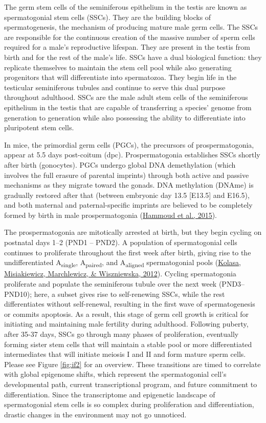 \documentclass[12pt,twoside]{reedthesis}
\begin{document}
The germ stem cells of the seminiferous epithelium in the testis are
known as spermatogonial stem cells (SSCs). They are the building blocks
of spermatogenesis, the mechanism of producing mature male germ cells.
The SSCs are responsible for the continuous creation of the massive
number of sperm cells required for a male's reproductive lifespan. They
are present in the testis from birth and for the rest of the male's
life. SSCs have a dual biological function: they replicate themselves to
maintain the stem cell pool while also generating progenitors that will
differentiate into spermatozoa. They begin life in the testicular
seminiferous tubules and continue to serve this dual purpose throughout
adulthood. SSCs are the male adult stem cells of the seminiferous
epithelium in the testis that are capable of transferring a species'
genome from generation to generation while also possessing the ability
to differentiate into pluripotent stem cells.

In mice, the primordial germ cells (PGCs), the precursors of
prospermatogonia, appear at 5.5 days post-coitum (dpc). Prospermatogonia
establishes SSCs shortly after birth (gonocytes). PGCs undergo global
DNA demethylation (which involves the full erasure of parental imprints)
through both active and passive mechanisms as they migrate toward the
gonads. DNA methylation (DNAme) is gradually restored after that
(between embryonic day 13.5 {[}E13.5{]} and E16.5), and both maternal and
paternal-specific imprints are believed to be completely formed by birth
in male prospermatogonia (\protect\hyperlink{ref-hammoud2015}{Hammoud et al., 2015}).

The prospermatogonia are mitotically arrested at birth, but they begin
cycling on postnatal days 1--2 (PND1 -- PND2). A population of
spermatogonial cells continues to proliferate throughout the first week
after birth, giving rise to the undifferentiated A\textsubscript{single}, A\textsubscript{paired}, and A\textsubscript{aligned} spermatogonial pools (\protect\hyperlink{ref-kolasa2012}{Kolasa, Misiakiewicz, Marchlewicz, \& Wiszniewska, 2012}). Cycling
spermatogonia proliferate and populate the seminiferous tubule over the
next week (PND3--PND10); here, a subset gives rise to self-renewing
SSCs, while the rest differentiates without self-renewal, resulting in
the first wave of spermatogenesis or commits apoptosis. As a result,
this stage of germ cell growth is critical for initiating and
maintaining male fertility during adulthood. Following puberty, after
35-37 days, SSCs go through many phases of proliferation, eventually
forming sister stem cells that will maintain a stable pool or more
differentiated intermediates that will initiate meiosis I and II and
form mature sperm cells. Please see Figure \ref{fig:if2} for an overview. These transitions are timed to correlate with
global epigenome shifts, which represent the spermatogonial cell's
developmental path, current transcriptional program, and future
commitment to differentiation. Since the transcriptome and epigenetic
landscape of spermatogonial stem cells is so complex during
proliferation and differentiation, drastic changes in the environment
may not go unnoticed.
\end{document}

